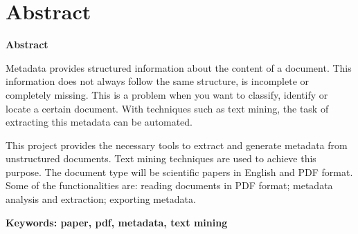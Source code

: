 \documentclass[../main.tex]{subfiles}
\begin{document}
\makeatletter
\renewenvironment{abstract}{%
    \if@twocolumn
      \section*{Abstract \\}%
    \else %
    \begin{flushright}
        {\filleft\Huge\bfseries\fontsize{48pt}{12}\selectfont Abstract\vspace{\z@}}%
        \end{flushright}
      \quotation
    \fi}
    {\if@twocolumn\else\endquotation\fi}
\makeatother

\begin{abstract}

Metadata provides structured information about the content of a document. This information does not always follow the same structure, is incomplete or completely missing. This is a problem when you want to classify, identify or locate a certain document. With techniques such as text mining, the task of extracting this metadata can be automated.

This project provides the necessary tools to extract and generate metadata from unstructured documents. Text mining techniques are used to achieve this purpose. The document type will be scientific papers in English and PDF format. Some of the functionalities are: reading documents in PDF format; metadata analysis and extraction; exporting metadata.

\bfseries{\large{Keywords:}} paper, pdf, metadata, text mining

\end{abstract}
\end{document}

